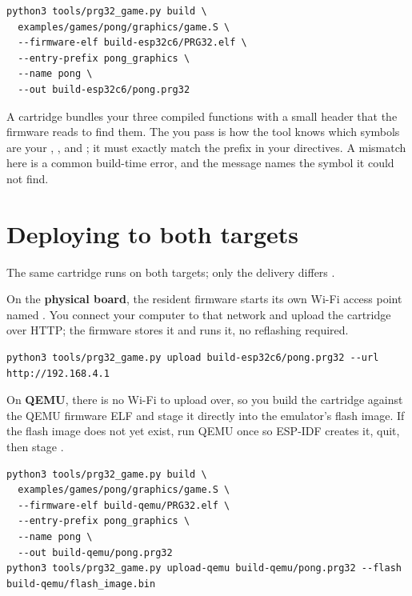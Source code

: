 \begin{lstlisting}[style=bash,caption={Building an assembly cartridge against the board firmware. The \texttt{--entry-prefix} must match your \texttt{<prefix>\_init/update/draw} symbols.}]
python3 tools/prg32_game.py build \
  examples/games/pong/graphics/game.S \
  --firmware-elf build-esp32c6/PRG32.elf \
  --entry-prefix pong_graphics \
  --name pong \
  --out build-esp32c6/pong.prg32
\end{lstlisting}

\begin{prgconcept}
A cartridge bundles your three compiled functions with a small header that the
firmware reads to find them. The  you pass is how the tool
knows which symbols are your , , and ; it must
exactly match the prefix in your  directives. A mismatch here is a
common build-time error, and the message names the symbol it could not find.
\end{prgconcept}

\section{Deploying to both targets}

The same cartridge runs on both targets; only the delivery differs
\citep{prg32qemu}.

On the \textbf{physical board}, the resident firmware starts its own Wi-Fi access
point named . You connect your computer to that network and upload the
cartridge over HTTP; the firmware stores it and runs it, no reflashing required.

\begin{lstlisting}[style=bash,caption={Uploading a cartridge to the board over its Wi-Fi access point.}]
python3 tools/prg32_game.py upload build-esp32c6/pong.prg32 --url http://192.168.4.1
\end{lstlisting}

On \textbf{QEMU}, there is no Wi-Fi to upload over, so you build the cartridge
against the QEMU firmware ELF and stage it directly into the emulator's flash
image. If the flash image does not yet exist, run QEMU once so ESP-IDF creates it,
quit, then stage \citep{prg32qemu}.

\begin{lstlisting}[style=bash,caption={Building and staging a cartridge for the emulator. Note the QEMU firmware ELF and the \texttt{upload-qemu} subcommand.}]
python3 tools/prg32_game.py build \
  examples/games/pong/graphics/game.S \
  --firmware-elf build-qemu/PRG32.elf \
  --entry-prefix pong_graphics \
  --name pong \
  --out build-qemu/pong.prg32
python3 tools/prg32_game.py upload-qemu build-qemu/pong.prg32 --flash build-qemu/flash_image.bin
\end{lstlisting}

